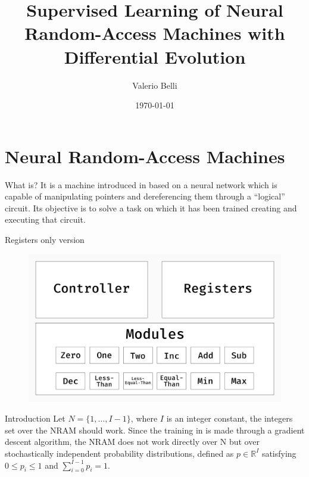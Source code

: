 \documentclass{beamer}
\title{Supervised Learning of Neural Random-Access Machines with Differential Evolution}
\date{\today}
\author{Valerio Belli}
\institute{Università degli Studi di Perugia}
\begin{document}
  \maketitle
  \section{Neural Random-Access Machines}
  \begin{frame}{What is?}
	It is a machine introduced in \cite{NRAM:2016} based on a neural network which is capable of manipulating pointers and dereferencing them through a ``logical'' circuit. Its objective is to solve a task on which it has been trained creating and executing that circuit.
  \end{frame}
  \begin{frame}{Registers only version}
  	\begin{figure}
  		\centering
  		\includegraphics[width=\textwidth]{../figures/schema-nram-without-memory.png}
  	\end{figure}
  \end{frame}
  \begin{frame}{Introduction}
  	Let $N = \{ 1, \dots, I - 1 \}$, where $I$ is an integer constant, the integers set over the NRAM should work. Since the training in \cite{NRAM:2016} is made through a gradient descent algorithm, the NRAM does not work directly over N but over stochastically independent probability distributions, defined as $p \in \mathbb{R}^{I}$ satisfying $0 \leq p_i \leq 1$ and $\sum\limits_{i=0}^{I - 1} p_i = 1$. 
  \end{frame}
\end{document}
